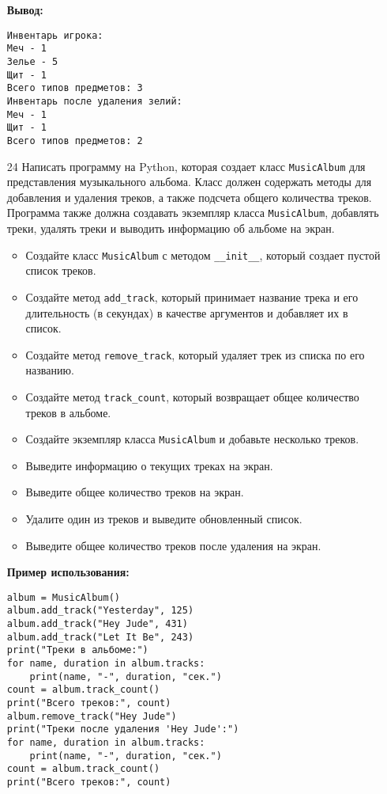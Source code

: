 \begin{enumerate}
\textbf{Вывод:}
\begin{verbatim}
Инвентарь игрока:
Меч - 1
Зелье - 5
Щит - 1
Всего типов предметов: 3
Инвентарь после удаления зелий:
Меч - 1
Щит - 1
Всего типов предметов: 2
\end{verbatim}

\item[24] Написать программу на Python, которая создает класс \texttt{MusicAlbum} для представления музыкального альбома. Класс должен содержать методы для добавления и удаления треков, а также подсчета общего количества треков. Программа также должна создавать экземпляр класса \texttt{MusicAlbum}, добавлять треки, удалять треки и выводить информацию об альбоме на экран.

\begin{itemize}
    \item Создайте класс \texttt{MusicAlbum} с методом \texttt{\_\_init\_\_}, который создает пустой список треков.
    \item Создайте метод \texttt{add\_track}, который принимает название трека и его длительность (в секундах) в качестве аргументов и добавляет их в список.
    \item Создайте метод \texttt{remove\_track}, который удаляет трек из списка по его названию.
    \item Создайте метод \texttt{track\_count}, который возвращает общее количество треков в альбоме.
    \item Создайте экземпляр класса \texttt{MusicAlbum} и добавьте несколько треков.
    \item Выведите информацию о текущих треках на экран.
    \item Выведите общее количество треков на экран.
    \item Удалите один из треков и выведите обновленный список.
    \item Выведите общее количество треков после удаления на экран.
\end{itemize}

\textbf{Пример использования:}

\begin{verbatim}
album = MusicAlbum()
album.add_track("Yesterday", 125)
album.add_track("Hey Jude", 431)
album.add_track("Let It Be", 243)
print("Треки в альбоме:")
for name, duration in album.tracks:
    print(name, "-", duration, "сек.")
count = album.track_count()
print("Всего треков:", count)
album.remove_track("Hey Jude")
print("Треки после удаления 'Hey Jude':")
for name, duration in album.tracks:
    print(name, "-", duration, "сек.")
count = album.track_count()
print("Всего треков:", count)
\end{verbatim}


\end{enumerate}
